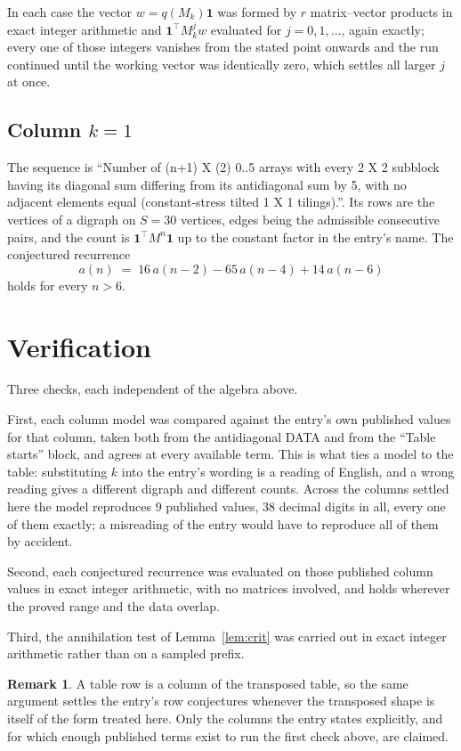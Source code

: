 \documentclass[11pt,a4paper]{article}
\theoremstyle{plain}
\theoremstyle{definition}
\newtheorem{remark}[theorem]{Remark}
\begin{document}
In each case the vector $w=q(M_k)\mathbf{1}$ was formed by $r$ matrix--vector products in
exact integer arithmetic and $\mathbf{1}^{\!\top}M_k^{j}w$ evaluated for $j=0,1,\dots$,
again exactly; every one of those integers vanishes from the stated point onwards and the run
continued until the working vector was identically zero, which settles all larger $j$ at once.

\subsection*{Column $k=1$}
The sequence is ``Number of (n+1) X (2) 0..5 arrays with every 2 X 2 subblock having its diagonal sum differing from its antidiagonal sum by 5, with no adjacent elements equal (constant-stress tilted 1 X 1 tilings).''. Its rows are the vertices of a digraph on
$S=30$ vertices, edges being the admissible consecutive pairs, and the count is
$\mathbf{1}^{\!\top}M^{n}\mathbf{1}$ up to the constant factor in the entry's name.
The conjectured recurrence
\[
a(n)\;=\;16\,a(n-2) - 65\,a(n-4) + 14\,a(n-6)
\]
holds for every $n>6$.

\section{Verification}

Three checks, each independent of the algebra above.

First, each column model was compared against the entry's own published values for that
column, taken both from the antidiagonal DATA and from the ``Table starts'' block, and agrees
at every available term. This is what ties a model to the table: substituting $k$ into the
entry's wording is a reading of English, and a wrong reading gives a different digraph and
different counts. Across the columns settled here the model reproduces $9$ published
values, $38$ decimal digits in all, every one of them exactly; a misreading of the entry
would have to reproduce all of them by accident.

Second, each conjectured recurrence was evaluated on those published column values in exact
integer arithmetic, with no matrices involved, and holds wherever the proved range and the
data overlap.

Third, the annihilation test of Lemma~\ref{lem:crit} was carried out in exact integer
arithmetic rather than on a sampled prefix.

\begin{remark}
A table row is a column of the transposed table, so the same argument settles the entry's row
conjectures whenever the transposed shape is itself of the form treated here. Only the columns
the entry states explicitly, and for which enough published terms exist to run the first check
above, are claimed.
\end{remark}
\end{document}
